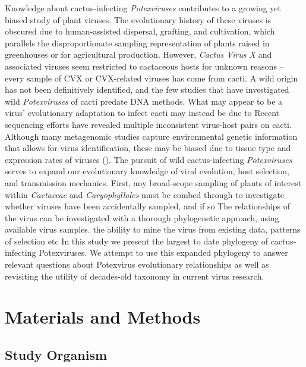 \documentclass[11pt,letterpaper,titlepage]{article}
\begin{document}
\begin{linenumbers}
Knowledge about cactus-infecting \textit{Potexviruses} contributes to a growing yet biased study of plant viruses. 
The evolutionary history of these viruses is obscured due to human-assisted dispersal, grafting, and cultivation, which parallels the disproportionate sampling representation of plants raised in greenhouses or for agricultural production. 
However, \textit{Cactus Virus X} and associated viruses seem restricted to cactaceous hosts for unknown reasons -- every sample of CVX or CVX-related viruses has come from cacti. 
A wild origin has not been definitively identified, and the few studies that have investigated wild \textit{Potexviruses} of cacti predate DNA methods.
What may appear to be a virus' evolutionary adaptation to infect cacti may instead be due to 
Recent sequencing efforts have revealed multiple inconsistent virus-host pairs on cacti. 
Although many metagenomic studies capture environmental genetic information that allows for virus identification, these may be biased due to tissue type and expression rates of viruses (\cite{lacroix2016methodological}). 
The pursuit of wild cactus-infecting \textit{Potexviruses} serves to expand our evolutionary knowledge of viral evolution, host selection, and transmission mechanics. 
First, any broad-scope sampling of plants of interest within \textit{Cactaceae} and \textit{Caryophyllales} must be combed through to investigate whether viruses have been accidentally sampled, and if so 
The relationships of the virus can be investigated with a thorough phylogenetic approach, using available virus samples. 
the ability to mine the virus from existing data, 
patterns of selection etc
In this study we present the largest to date phylogeny of cactus-infecting Potexviruses. 
We attempt to use this expanded phylogeny to answer relevant questions about Potexvirus evolutionary relationships as well as revisiting the utility of decades-old taxonomy in current virus research. 

\section*{Materials and Methods}

\subsection*{Study Organism}



\end{linenumbers}
\end{document}
